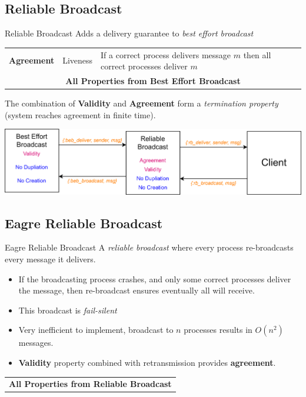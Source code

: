 \subsection{Reliable Broadcast}
\begin{definitionbox}{Reliable Broadcast}
    Adds a delivery guarantee to \textit{best effort broadcast}  
    \begin{center}
        \begin{tabular}{l l p{}}
            \textbf{Agreement} & Liveness & If a correct process delivers message $m$ then all correct processes deliver $m$ \\
            \multicolumn{3}{c}{\textbf{All Properties from Best Effort Broadcast}} \\
        \end{tabular}
    \end{center}
    The combination of \textbf{Validity} and \textbf{Agreement} form a \textit{termination property} (system reaches agreement in finite time).
\end{definitionbox}
\includegraphics[width=.8\textwidth]{reliable_broadcast/images/reliable_broadcast.drawio.png}

\subsection{Eagre Reliable Broadcast}
\begin{definitionbox}{Eagre Reliable Broadcast}
    A \textit{reliable broadcast} where every process re-broadcasts every message it delivers.
    \begin{itemize}
        \item If the broadcasting process crashes, and only some correct processes deliver the message, then re-broadcast ensures eventually all will receive.
        \item This broadcast is \textit{fail-silent}
        \item Very inefficient to implement, broadcast to $n$ processes results in $O(n^2)$ messages.
        \item \textbf{Validity} property combined with retransmission provides \textbf{agreement}.
    \end{itemize}
    \begin{center}
        \begin{tabular}{l l p{}}
            \multicolumn{3}{c}{\textbf{All Properties from Reliable Broadcast}} \\
        \end{tabular}
    \end{center}
\end{definitionbox}

